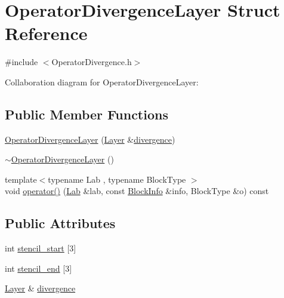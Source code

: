 \hypertarget{struct_operator_divergence_layer}{}\section{Operator\+Divergence\+Layer Struct Reference}
\label{struct_operator_divergence_layer}


{\ttfamily \#include $<$Operator\+Divergence.\+h$>$}



Collaboration diagram for Operator\+Divergence\+Layer\+:
\subsection*{Public Member Functions}
\begin{DoxyCompactItemize}
\item 
\hyperlink{struct_operator_divergence_layer_abae01528fbc5323cfeab708f5942fc0c}{Operator\+Divergence\+Layer} (\hyperlink{struct_layer}{Layer} \&\hyperlink{struct_operator_divergence_layer_ad330cbeb8c609a3bd92639c50a4cc7b1}{divergence})
\item 
\hyperlink{struct_operator_divergence_layer_ab879de5dd496c4f07b8c6c2c632050f2}{$\sim$\+Operator\+Divergence\+Layer} ()
\item 
{\footnotesize template$<$typename Lab , typename Block\+Type $>$ }\\void \hyperlink{struct_operator_divergence_layer_a764c3ca9116897888c989ff440460e04}{operator()} (\hyperlink{_definitions_8h_ad6f951af9a2a6ebc1975404882b34314}{Lab} \&lab, const \hyperlink{struct_block_info}{Block\+Info} \&info, Block\+Type \&o) const 
\end{DoxyCompactItemize}
\subsection*{Public Attributes}
\begin{DoxyCompactItemize}
\item 
int \hyperlink{struct_operator_divergence_layer_adece33a63a9dea1acea07d718d60a9cc}{stencil\+\_\+start} \mbox{[}3\mbox{]}
\item 
int \hyperlink{struct_operator_divergence_layer_a7be5f8f62d9f724c8708f2dd26101def}{stencil\+\_\+end} \mbox{[}3\mbox{]}
\item 
\hyperlink{struct_layer}{Layer} \& \hyperlink{struct_operator_divergence_layer_ad330cbeb8c609a3bd92639c50a4cc7b1}{divergence}
\end{DoxyCompactItemize}



